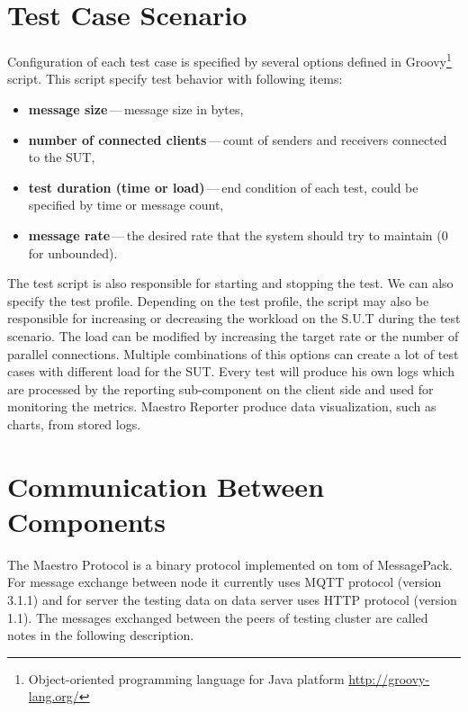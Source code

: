 \newpage

\section{Test Case Scenario}
Configuration of each test case is specified by several options defined in Groovy\footnote{Object-oriented programming language for Java platform \url{http://groovy-lang.org/}} script. This script specify test behavior with following items:

\begin{itemize}
	\setlength\itemsep{0em}
	\item \textbf{message size}\,---\,message size in bytes,
	\item \textbf{number of connected clients}\,---\,count of senders and receivers connected to the SUT,
	\item \textbf{test duration (time or load)}\,---\,end condition of each test, could be specified by time or message count,
	\item \textbf{message rate}\,---\,the desired rate that the system should try to maintain (0 for unbounded).
\end{itemize}

The test script is also responsible for starting and stopping the test. We can also specify the test profile. Depending on the test profile, the script may also be responsible for increasing or decreasing the workload on the S.U.T during the test scenario. The load can be modified by increasing the target rate or the number of parallel connections. Multiple combinations of this options can create a lot of test cases with different load for the SUT. Every test will produce his own logs which are processed by the reporting sub-component on the client side and used for monitoring the metrics. Maestro Reporter produce data visualization, such as charts, from stored logs.

\section{Communication Between Components}
\label{Communication Between Components}
The Maestro Protocol is a binary protocol implemented on tom of MessagePack\footnotemark{}. For message exchange between node it currently uses MQTT protocol (version 3.1.1) and for server the testing data on data server uses HTTP protocol (version 1.1). The messages exchanged between the peers of testing cluster are called notes in the following description.


